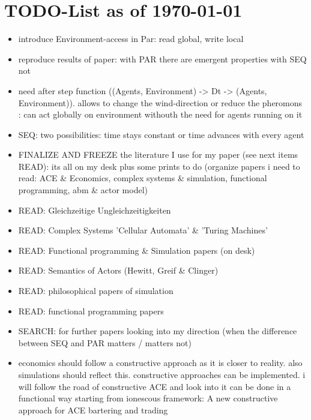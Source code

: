 \section{TODO-List as of \today}

\begin{itemize}
\item introduce Environment-access in Par: read global, write local

\item reproduce results of paper: with PAR there are emergent properties with SEQ not

\item need after step function ((Agents, Environment) -> Dt -> (Agents, Environment)). allows to change the wind-direction or reduce the pheromons : can act globally on environment withouth the need for agents running on it



\item SEQ: two possibilities: time stays constant or time advances with every agent


\item FINALIZE AND FREEZE the literature I use for my paper (see next items READ): its all on my desk plus some prints to do (organize papers i need to read: ACE & Economics, complex systems & simulation, functional programming, abm \& actor model)
\item READ: Gleichzeitige Ungleichzeitigkeiten
\item READ: Complex Systems 'Cellular Automata' \& 'Turing Machines'
\item READ: Functional programming \& Simulation papers (on desk)
\item READ: Semantics of Actors (Hewitt, Greif \& Clinger)
\item READ: philosophical papers of simulation
\item READ: functional programming papers
\item SEARCH: for further papers looking into my direction (when the difference between SEQ and PAR matters / matters not)

\item economics should follow a constructive approach as it is closer to reality. also simulations should reflect this. constructive approaches can be implemented. i will follow the road of constructive ACE and look into it can be done in a functional way starting from ionescous framework: A new constructive approach for  ACE bartering and trading


\end{itemize}
